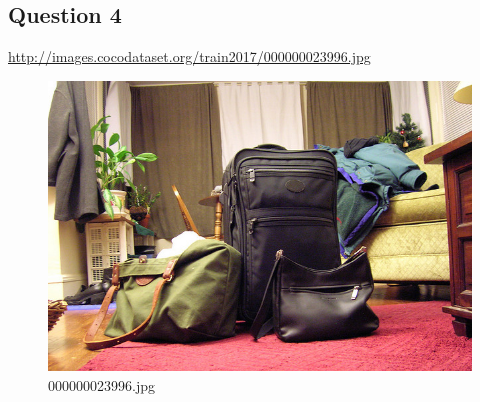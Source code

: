 \subsection*{Question 4}
\url{http://images.cocodataset.org/train2017/000000023996.jpg}
    \begin{figure}[h]
        \centering
        \includegraphics[width=0.8\linewidth]{../image set/easy/000000023996.jpg}
        \caption{000000023996.jpg}
    \end{figure}
